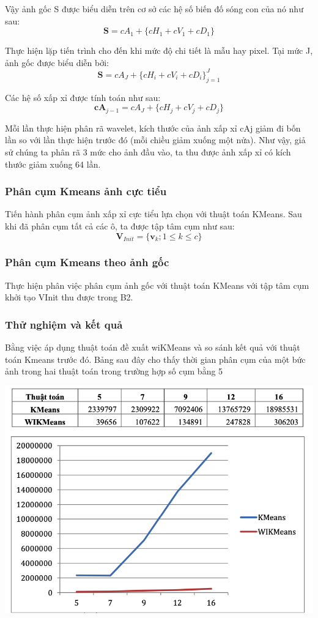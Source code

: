 \documentclass[12pt,a4paper]{article}
\begin{document}
Vậy ảnh gốc S được biểu diễn trên cơ sở các hệ số biến đố sóng con của nó như sau: $$\mathbf{S} = cA_1 + \{cH_1 + cV_1 + cD_1\}$$

Thực hiện lặp tiến trình cho đến khi mức độ chi tiết là mẫu hay pixel. Tại mức J, ảnh gốc được biểu diễn bởi: $$\mathbf{S} = cA_J + \{cH_i + cV_i + cD_i\}_{j=1}^J$$

Các hệ số xấp xỉ được tính toán như sau: $$\mathbf{cA}_{j-1} = cA_J + \{cH_j + cV_j + cD_j\}$$

Mỗi lần thực hiện phân rã wavelet, kích thước của ảnh xấp xỉ cAj giảm đi bốn lần so với lần thực hiện trước đó (mỗi chiều giảm xuống một nửa). Như vậy, giả sử chúng ta phân rã 3 mức cho ảnh đầu vào, ta thu được ảnh xấp xỉ có kích thước giảm xuống 64 lần.

\subsubsection{Phân cụm Kmeans ảnh cực tiểu}
Tiến hành phân cụm ảnh xấp xỉ cực tiểu lựa chọn với thuật toán KMeans. Sau khi đã phân cụm tất cả các ô, ta được tập tâm cụm như sau:$$\mathbf{V}_{Init} = \{ \mathbf{v}_k; 1\leq k\leq c \}$$

\subsubsection{Phân cụm Kmeans theo ảnh gốc}
Thực hiện phân việc phân cụm ảnh gốc với thuật toán KMeans với tập tâm cụm khởi tạo VInit thu được trong B2.

\subsubsection{Thử nghiệm và kết quả}
Bằng việc áp dụng thuật toán đề xuất wiKMeans và so sánh kết quả với thuật toán Kmeans trước đó. Bảng sau đây cho thấy thời gian phân cụm của một bức ảnh trong hai thuật toán trong trường hợp số cụm bằng 5

\begin{center}
\includegraphics[scale=0.5]{kmeansimprovedata.png}
\end{center}
\end{document}

